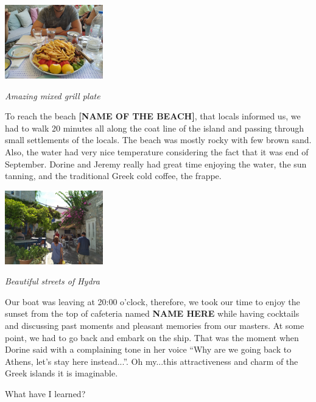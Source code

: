 \documentclass[10pt,a4paper]{article} %
\newcommand{\NewsItem}[1]{ %
\usefont{T1}{fvs}{n}{n} %
\vspace{24pt}\large #1\vspace{3pt} %
\par \normalsize \normalfont}
\begin{document}
\begin{multicols}{3}
\begin{center}
	\includegraphics[width=0.32\textwidth]{media/hydra_food}
	\par\textit{Amazing mixed grill plate}
\end{center}


To reach the beach \textbf{[NAME OF THE BEACH]}, that locals informed us, 
we had to walk 20 minutes all along the coat line of the island and passing 
through small settlements of the locals. 
The beach was mostly rocky with few brown sand. 
Also, the water had very nice temperature considering the fact that it was 
end of September. 
Dorine and Jeremy really had great time enjoying the water, the sun tanning, 
and the traditional Greek cold coffee, the frappe. 


\begin{center}
	\includegraphics[width=0.32\textwidth]{media/hydra_city}
	\par\textit{Beautiful streets of Hydra}
\end{center}


Our boat was leaving at 20:00 o'clock, therefore, we took our time to enjoy 
the sunset from the top of cafeteria named \textbf{NAME HERE} while having 
cocktails and discussing past moments and pleasant memories from our masters. 
At some point, we had to go back and embark on the ship. 
That was the moment when Dorine said with a complaining tone in her voice 
``Why are we going back to Athens, let's stay here instead...''. 
Oh my...this attractiveness and charm of the Greek islands it is imaginable.


\NewsItem{What have I learned?}


\end{multicols}
\end{document}
